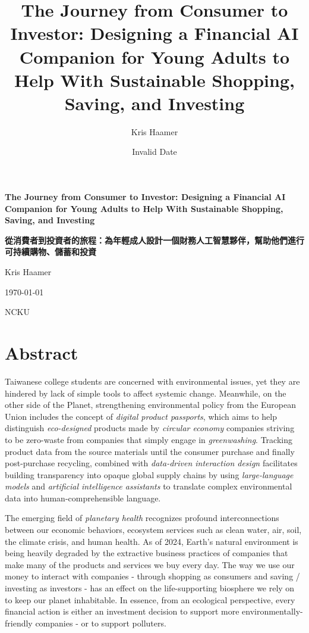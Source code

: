 \documentclass[
  letterpaper,
  DIV=11,
  numbers=noendperiod]{scrartcl}
\title{The Journey from Consumer to Investor: Designing a Financial AI
Companion for Young Adults to Help With Sustainable Shopping, Saving,
and Investing}
\author{Kris Haamer}
\date{Invalid Date}
\renewcommand*\contentsname{Table of contents}
\newcommand\contentsname{Table of contents}
\begin{document}
\maketitle

\renewcommand*\contentsname{Table of contents}
{
\hypersetup{linkcolor=}
\setcounter{tocdepth}{3}
\tableofcontents
}

\begin{titlepage}
    \centering
    \vspace*{1in}
    {\LARGE \textbf{The Journey from Consumer to Investor: Designing a Financial AI Companion for Young Adults to Help With Sustainable Shopping, Saving, and Investing} \par}
    \vspace{0.5in}
    {\LARGE \textbf{從消費者到投資者的旅程：為年輕成人設計一個財務人工智慧夥伴，幫助他們進行可持續購物、儲蓄和投資} \par}
    \vspace{0.5in}
    {\Large Kris Haamer \par}
    \vfill
    {\Large \today \par}
    \vspace{1.5in}
    {\Large NCKU \par}
\end{titlepage}

\newpage

\section{Abstract}\label{abstract}

Taiwanese college students are concerned with environmental issues, yet
they are hindered by lack of simple tools to affect systemic change.
Meanwhile, on the other side of the Planet, strengthening environmental
policy from the European Union includes the concept of \emph{digital
product passports}, which aims to help distinguish \emph{eco-designed}
products made by \emph{circular economy} companies striving to be
zero-waste from companies that simply engage in \emph{greenwashing}.
Tracking product data from the source materials until the consumer
purchase and finally post-purchase recycling, combined with
\emph{data-driven interaction design} facilitates building transparency
into opaque global supply chains by using \emph{large-language models}
and \emph{artificial intelligence assistants} to translate complex
environmental data into human-comprehensible language.

The emerging field of \emph{planetary health} recognizes profound
interconnections between our economic behaviors, ecosystem services such
as clean water, air, soil, the climate crisis, and human health. As of
2024, Earth's natural environment is being heavily degraded by the
extractive business practices of companies that make many of the
products and services we buy every day. The way we use our money to
interact with companies - through shopping as consumers and saving /
investing as investors - has an effect on the life-supporting biosphere
we rely on to keep our planet inhabitable. In essence, from an
ecological perspective, every financial action is either an investment
decision to support more environmentally-friendly companies - or to
support polluters.
\end{document}
